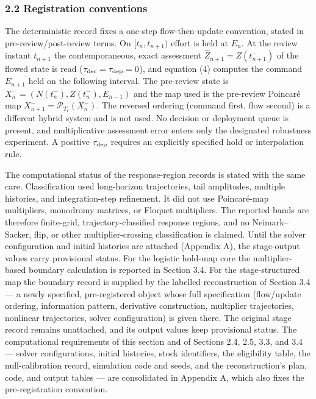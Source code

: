\documentclass[11pt]{article}
\begin{document}
\subsubsection{2.2 Registration
conventions}\label{registration-conventions}

The deterministic record fixes a one-step flow-then-update convention,
stated in pre-review/post-review terms. On \([t_n, t_{n+1})\) effort is
held at \(E_n\). At the review instant \(t_{n+1}\) the contemporaneous,
exact assessment \(\widehat Z_{n+1} = Z(t_{n+1}^-)\) of the flowed state
is read (\(\tau_{\rm dec}=\tau_{\rm dep}=0\)), and equation (4) computes
the command \(E_{n+1}\) held on the following interval. The pre-review
state is \(X_n^-=(N(t_n^-),Z(t_n^-),E_{n-1})\) and the map used is
the pre-review Poincar\'e map \(X_{n+1}^-=\mathcal P_{T_r}(X_n^-)\). The
reversed ordering (command first, flow second) is a different hybrid
system and is not used. No decision or deployment queue is present, and
multiplicative assessment error enters only the designated robustness
experiment. A positive \(\tau_{\rm dep}\) requires an explicitly
specified hold or interpolation rule.

The computational status of the response-region records is stated with
the same care. Classification used long-horizon trajectories, tail
amplitudes, multiple histories, and integration-step refinement. It did
not use Poincar\'e-map multipliers, monodromy matrices, or Floquet
multipliers. The reported bands are therefore finite-grid,
trajectory-classified response regions, and no Neimark--Sacker, flip, or
other multiplier-crossing classification is claimed. Until the solver
configuration and initial histories are attached (Appendix A), the
stage-output values carry provisional status. For the logistic hold-map
core the multiplier-based boundary calculation is reported in Section 3.4. For the
stage-structured map the boundary record is supplied by the labelled
reconstruction of Section 3.4 --- a newly specified, pre-registered
object whose full specification (flow/update ordering, information
pattern, derivative construction, multiplier trajectories, nonlinear
trajectories, solver configuration) is given there. The original
stage record remains unattached, and its output values keep provisional
status. The computational requirements of this
section and of Sections 2.4, 2.5, 3.3, and 3.4 --- solver
configurations, initial histories, stock identifiers, the eligibility
table, the null-calibration record, simulation code and seeds, and the
reconstruction's plan, code, and output tables --- are consolidated in
Appendix A, which also fixes the pre-registration convention.
\end{document}
